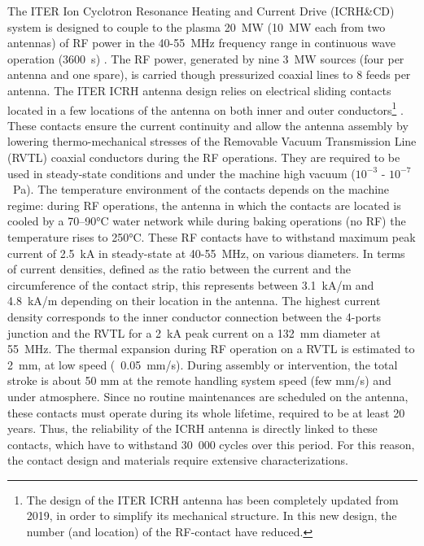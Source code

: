{The ITER Ion Cyclotron Resonance Heating and Current Drive (ICRH\&CD) system is designed to couple to the plasma 20~MW (10~MW each from two antennas) of RF power in the 40-55~MHz frequency range in continuous wave operation (3600~s) . The RF power, generated by nine 3~MW sources (four per antenna and one spare), is carried though pressurized coaxial lines to 8 feeds per antenna. The ITER ICRH antenna design relies on electrical sliding contacts located in a few locations of the antenna on both inner and outer conductors\footnote{The design of the ITER ICRH antenna has been completely updated from 2019, in order to simplify its mechanical structure. In this new design, the number (and location) of the RF-contact have reduced.} . These contacts ensure the current continuity and allow the antenna assembly by lowering thermo-mechanical stresses of the Removable Vacuum Transmission Line (RVTL) coaxial conductors during the RF operations. They are required to be used in steady-state conditions and under the machine high vacuum ($ 10^{-3}$ - $10^{-7}$~\si{Pa}). The temperature environment of the contacts depends on the machine regime: during RF operations, the antenna in which the contacts are located is cooled by a 70–90$\si{\degreeCelsius}$ water network while during baking operations (no RF) the temperature rises to 250$\si{\degreeCelsius}$. These RF contacts have to withstand maximum peak current of 2.5~kA in steady-state at 40-55~MHz, on various diameters. In terms of current densities, defined as the ratio between the current and the circumference of the contact strip, this represents between 3.1~kA/m and 4.8~kA/m depending on their location in the antenna. The highest current density corresponds to the inner conductor connection between the 4-ports junction and the RVTL for a 2~kA peak current on a 132~mm diameter at 55~MHz. The thermal expansion during RF operation on a RVTL is estimated to 2~mm, at low speed (~0.05~mm/s). During assembly or intervention, the total stroke is about 50 mm at the remote handling system speed (few \si{mm/s}) and under atmosphere. Since no routine maintenances are scheduled on the antenna, these contacts must operate during its whole lifetime, required to be at least 20 years. Thus, the reliability of the ICRH antenna is directly linked to these contacts, which have to withstand 30~000 cycles over this period. For this reason, the contact design and materials require extensive characterizations.
\begin{marginfigure}[-9cm]

\end{marginfigure}}
